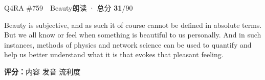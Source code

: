 \begin{qblock}{Q4\quad RA \#759\ \ Beauty}{朗读 · 总分 \textcolor{cAccent}{\bfseries 31}/90}
\begin{promptbox}
Beauty is subjective, and as such it of course cannot be defined in absolute terms. But we all know or feel when something is beautiful to us personally. And in such instances, methods of physics and network science can be used to quantify and help us better understand what it is that evokes that pleasant feeling.
\end{promptbox}
\asrlegend
\begin{asrbox}
   \pse {}                             \pse {}      \pse {}               \pse {}   
\end{asrbox}
\smallskip
{\small\textbf{评分：}内容  \quad\textperiodcentered\quad 发音  \quad\textperiodcentered\quad 流利度 }
\end{qblock}

